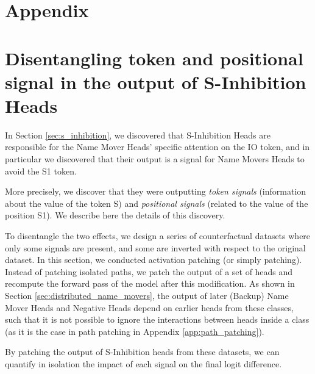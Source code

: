 \section{Appendix}

\appendix


\section{Disentangling token and positional signal in the output of S-Inhibition Heads} \label{app:disantangling_signals}

In Section \ref{sec:s_inhibition}, we discovered that S-Inhibition Heads are responsible for the Name Mover Heads' specific attention on the IO token, and in particular we discovered that their output is a signal for Name Movers Heads to avoid the S1 token. 

More precisely, we discover that they were outputting \emph{token signals} (information about the value of the token S) and \emph{positional signals} (related to the value of the position S1). We describe here the details of this discovery.

To disentangle the two effects, we design a series of counterfactual datasets where only some signals are present, and some are inverted with respect to the original dataset. In this section, we conducted activation patching (or simply patching). Instead of patching isolated paths, we patch the output of a set of heads and recompute the forward pass of the model after this modification. As shown in Section \ref{sec:distributed_name_movers}, the output of later (Backup) Name Mover Heads and Negative Heads depend on earlier heads from these classes, such that it is not possible to ignore the interactions between heads inside a class (as it is the case in path patching in Appendix \ref{app:path_patching}).

By patching the output of S-Inhibition heads from these datasets, we can quantify in isolation the impact of each signal on the final logit difference.

